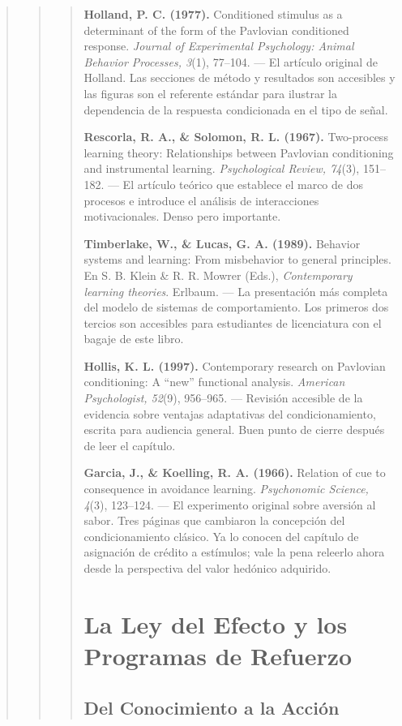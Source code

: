 \documentclass[
  letterpaper,
  DIV=11,
  numbers=noendperiod]{scrreprt}
\begin{document}
\begin{tcolorbox}[enhanced jigsaw, arc=.35mm, bottomrule=.15mm, breakable, colback=white, colframe=quarto-callout-note-color-frame, left=2mm, leftrule=.75mm, opacityback=0, rightrule=.15mm, toprule=.15mm]
\begin{quote}
\begin{quote}
\begin{quote}
\textbf{Holland, P. C. (1977).} Conditioned stimulus as a determinant of
the form of the Pavlovian conditioned response. \emph{Journal of
Experimental Psychology: Animal Behavior Processes, 3}(1), 77--104. ---
El artículo original de Holland. Las secciones de método y resultados
son accesibles y las figuras son el referente estándar para ilustrar la
dependencia de la respuesta condicionada en el tipo de señal.

\textbf{Rescorla, R. A., \& Solomon, R. L. (1967).} Two-process learning
theory: Relationships between Pavlovian conditioning and instrumental
learning. \emph{Psychological Review, 74}(3), 151--182. --- El artículo
teórico que establece el marco de dos procesos e introduce el análisis
de interacciones motivacionales. Denso pero importante.

\textbf{Timberlake, W., \& Lucas, G. A. (1989).} Behavior systems and
learning: From misbehavior to general principles. En S. B. Klein \& R.
R. Mowrer (Eds.), \emph{Contemporary learning theories}. Erlbaum. --- La
presentación más completa del modelo de sistemas de comportamiento. Los
primeros dos tercios son accesibles para estudiantes de licenciatura con
el bagaje de este libro.

\textbf{Hollis, K. L. (1997).} Contemporary research on Pavlovian
conditioning: A ``new'' functional analysis. \emph{American
Psychologist, 52}(9), 956--965. --- Revisión accesible de la evidencia
sobre ventajas adaptativas del condicionamiento, escrita para audiencia
general. Buen punto de cierre después de leer el capítulo.

\textbf{Garcia, J., \& Koelling, R. A. (1966).} Relation of cue to
consequence in avoidance learning. \emph{Psychonomic Science, 4}(3),
123--124. --- El experimento original sobre aversión al sabor. Tres
páginas que cambiaron la concepción del condicionamiento clásico. Ya lo
conocen del capítulo de asignación de crédito a estímulos; vale la pena
releerlo ahora desde la perspectiva del valor hedónico adquirido.


\mbox{}%
\chapter{La Ley del Efecto y los Programas de
Refuerzo}\label{la-ley-del-efecto-y-los-programas-de-refuerzo}

\mbox{}%
\section{Del Conocimiento a la
Acción}\label{del-conocimiento-a-la-acciuxf3n}


\end{quote}
\end{quote}
\end{quote}
\end{tcolorbox}
\end{document}
